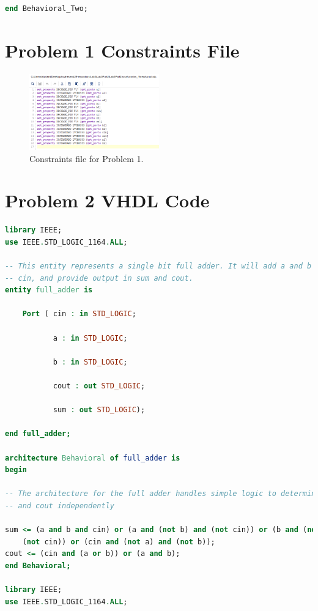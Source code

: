\documentclass[11pt]{article}
\begin{document}
\begin{appendices}
\begin{lstlisting}[language=VHDL]
end Behavioral_Two;

\end{lstlisting}

\section{Problem 1 Constraints File}
\begin{figure}[H]
\begin{center}
	\includegraphics[width=0.5\textwidth]{./report-images/Part2/P2Const.png}
	\caption{\label{fig:Part1ConstFile}Constraints file for Problem 1.}
\end{center}
\end{figure}

\section{Problem 2 VHDL Code}
\begin{lstlisting}[language=VHDL]
library IEEE;
use IEEE.STD_LOGIC_1164.ALL;

-- This entity represents a single bit full adder. It will add a and b along with 
-- cin, and provide output in sum and cout.
entity full_adder is

    Port ( cin : in STD_LOGIC;

           a : in STD_LOGIC;

           b : in STD_LOGIC;

           cout : out STD_LOGIC;

           sum : out STD_LOGIC);

end full_adder;

architecture Behavioral of full_adder is
begin

-- The architecture for the full adder handles simple logic to determine sum 
-- and cout independently

sum <= (a and b and cin) or (a and (not b) and (not cin)) or (b and (not a) and 
	(not cin)) or (cin and (not a) and (not b));
cout <= (cin and (a or b)) or (a and b);
end Behavioral;

library IEEE;
use IEEE.STD_LOGIC_1164.ALL;


\end{lstlisting}
\end{appendices}
\end{document}
